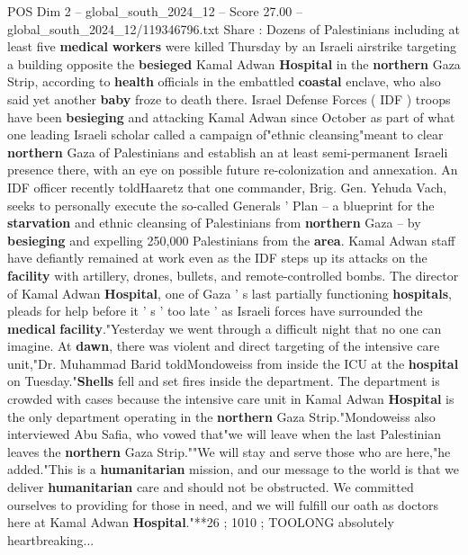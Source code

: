 \begin{textsample}{POS Dim 2 – global\_south\_2024\_12 – Score 27.00 – global\_south\_2024\_12/119346796.txt}  \label{ex:f2_pos_066}
Share : Dozens of Palestinians including at least five \textbf{medical} \textbf{workers} were killed Thursday by an Israeli airstrike targeting a building opposite the \textbf{besieged} Kamal Adwan \textbf{Hospital} in the \textbf{northern} Gaza Strip, according to \textbf{health} officials in the embattled \textbf{coastal} enclave, who also said yet another \textbf{baby} froze to death there.
Israel Defense Forces ( IDF ) troops have been \textbf{besieging} and attacking Kamal Adwan since October as part of what one leading Israeli scholar called a campaign of"ethnic cleansing"meant to clear \textbf{northern} Gaza of Palestinians and establish an at least semi-permanent Israeli presence there, with an eye on possible future re-colonization and annexation.
An IDF officer recently toldHaaretz that one commander, Brig.
Gen.
Yehuda Vach, seeks to personally execute the so-called Generals ' Plan -- a blueprint for the \textbf{starvation} and ethnic cleansing of Palestinians from \textbf{northern} Gaza -- by \textbf{besieging} and expelling 250,000 Palestinians from the \textbf{area}.
Kamal Adwan staff have defiantly remained at work even as the IDF steps up its attacks on the \textbf{facility} with artillery, drones, bullets, and remote-controlled bombs.
The director of Kamal Adwan \textbf{Hospital}, one of Gaza ' s last partially functioning \textbf{hospitals}, pleads for help before it ' s ' too late ' as Israeli forces have surrounded the \textbf{medical} \textbf{facility}."Yesterday we went through a difficult night that no one can imagine.
At \textbf{dawn}, there was violent and direct targeting of the intensive care unit,"Dr.
Muhammad Barid toldMondoweiss from inside the ICU at the \textbf{hospital} on Tuesday."\textbf{Shells} fell and set fires inside the department.
The department is crowded with cases because the intensive care unit in Kamal Adwan \textbf{Hospital} is the only department operating in the \textbf{northern} Gaza Strip."Mondoweiss also interviewed Abu Safia, who vowed that"we will leave when the last Palestinian leaves the \textbf{northern} Gaza Strip.""We will stay and serve those who are here,"he added."This is a \textbf{humanitarian} mission, and our message to the world is that we deliver \textbf{humanitarian} care and should not be obstructed.
We committed ourselves to providing for those in need, and we will fulfill our oath as doctors here at Kamal Adwan \textbf{Hospital}."**26 ; 1010 ; TOOLONG absolutely heartbreaking...

\end{textsample}
